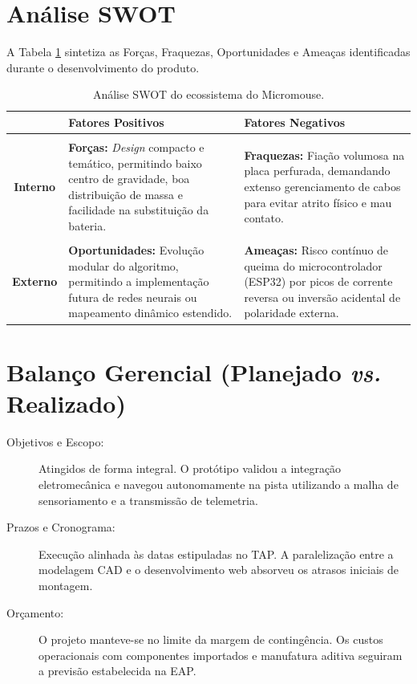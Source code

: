 \section{Análise SWOT}

A Tabela \ref{tab:swot} sintetiza as Forças, Fraquezas, Oportunidades e Ameaças identificadas durante o desenvolvimento do produto.

\begin{table}[H]
    \centering
    \small
    \renewcommand{\arraystretch}{1.4}
    \caption{Análise SWOT do ecossistema do Micromouse.}
    \label{tab:swot}
    \begin{tabularx}{\linewidth}{|c|X|X|}
        \hline
        & \textbf{Fatores Positivos} & \textbf{Fatores Negativos} \\ \hline
        
        \makecell{\textbf{Ambiente} \\ \textbf{Interno}} & 
        \textbf{Forças:} \textit{Design} compacto e temático, permitindo baixo centro de gravidade, boa distribuição de massa e facilidade na substituição da bateria. & 
        \textbf{Fraquezas:} Fiação volumosa na placa perfurada, demandando extenso gerenciamento de cabos para evitar atrito físico e mau contato. \\ \hline
        
        \makecell{\textbf{Ambiente} \\ \textbf{Externo}} & 
        \textbf{Oportunidades:} Evolução modular do algoritmo, permitindo a implementação futura de redes neurais ou mapeamento dinâmico estendido. & 
        \textbf{Ameaças:} Risco contínuo de queima do microcontrolador (ESP32) por picos de corrente reversa ou inversão acidental de polaridade externa. \\ \hline
    \end{tabularx}
\end{table}

\section{Balanço Gerencial (Planejado \textit{vs.} Realizado)}

\begin{description}
    \item[Objetivos e Escopo:] Atingidos de forma integral. O protótipo validou a integração eletromecânica e navegou autonomamente na pista utilizando a malha de sensoriamento e a transmissão de telemetria.
    \item[Prazos e Cronograma:] Execução alinhada às datas estipuladas no TAP. A paralelização entre a modelagem CAD e o desenvolvimento web absorveu os atrasos iniciais de montagem.
    \item[Orçamento:] O projeto manteve-se no limite da margem de contingência. Os custos operacionais com componentes importados e manufatura aditiva seguiram a previsão estabelecida na EAP.
\end{description}

